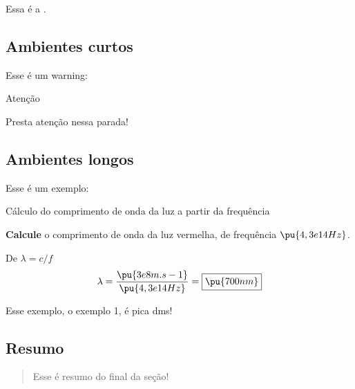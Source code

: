 Essa é a .

\subsection{Ambientes curtos}\label{ambientes-curtos}

Esse é um warning:

\begin{warning}{Atenção}

Presta atenção nessa parada!

\end{warning}

\subsection{Ambientes longos}\label{ambientes-longos}

Esse é um exemplo:

\begin{example}{Cálculo do comprimento de onda da luz a partir da frequência}

\textbf{Calcule} o comprimento de onda da luz vermelha, de frequência \(\pu{4,3e14 Hz}\).


De \(\lambda = c/f\) \[
    \lambda = \dfrac{ \pu{3e8 m.s-1} }{ \pu{4,3e14 Hz} } = \boxed{ \pu{700 nm} }
\]

\end{example}

Esse exemplo, o exemplo 1, é pica dms!

\subsection{Resumo}\label{resumo}

\begin{quote}
Esse é resumo do final da seção!
\end{quote}